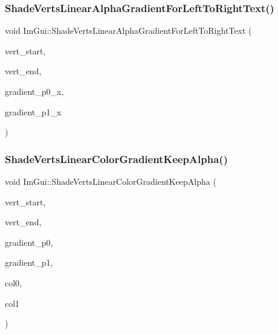 \hypertarget{namespace_im_gui_a73b4d230c8fffd2a07d799cd9d4e2a03}{}\label{namespace_im_gui_a73b4d230c8fffd2a07d799cd9d4e2a03} 
\subsubsection{\texorpdfstring{Shade\+Verts\+Linear\+Alpha\+Gradient\+For\+Left\+To\+Right\+Text()}{ShadeVertsLinearAlphaGradientForLeftToRightText()}}
{\footnotesize\ttfamily void Im\+Gui\+::\+Shade\+Verts\+Linear\+Alpha\+Gradient\+For\+Left\+To\+Right\+Text (\begin{DoxyParamCaption}\item[{\hyperlink{struct_im_draw_vert}{Im\+Draw\+Vert} $\ast$}]{vert\+\_\+start,  }\item[{\hyperlink{struct_im_draw_vert}{Im\+Draw\+Vert} $\ast$}]{vert\+\_\+end,  }\item[{float}]{gradient\+\_\+p0\+\_\+x,  }\item[{float}]{gradient\+\_\+p1\+\_\+x }\end{DoxyParamCaption})}

\hypertarget{namespace_im_gui_a7880876c5072e610be8f8e898d2a8866}{}\label{namespace_im_gui_a7880876c5072e610be8f8e898d2a8866} 
\subsubsection{\texorpdfstring{Shade\+Verts\+Linear\+Color\+Gradient\+Keep\+Alpha()}{ShadeVertsLinearColorGradientKeepAlpha()}}
{\footnotesize\ttfamily void Im\+Gui\+::\+Shade\+Verts\+Linear\+Color\+Gradient\+Keep\+Alpha (\begin{DoxyParamCaption}\item[{\hyperlink{struct_im_draw_vert}{Im\+Draw\+Vert} $\ast$}]{vert\+\_\+start,  }\item[{\hyperlink{struct_im_draw_vert}{Im\+Draw\+Vert} $\ast$}]{vert\+\_\+end,  }\item[{\hyperlink{struct_im_vec2}{Im\+Vec2}}]{gradient\+\_\+p0,  }\item[{\hyperlink{struct_im_vec2}{Im\+Vec2}}]{gradient\+\_\+p1,  }\item[{Im\+U32}]{col0,  }\item[{Im\+U32}]{col1 }\end{DoxyParamCaption})}

